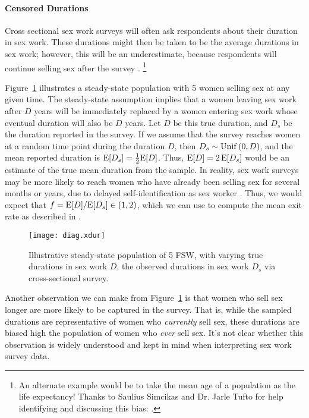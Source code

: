 \paragraph{Censored Durations}
Cross sectional sex work surveys will often ask respondents about their duration in sex work.
These durations might then be taken to be the average durations in sex work;
however, this will be an underestimate,
because respondents will continue selling sex after the survey \cite{Fazito2012}.%
\footnote{An alternate example would be
  to take the mean age of a population as the life expectancy!
  Thanks to Saulius Simcikas and Dr. Jarle Tufto
  for help identifying and discussing this bias:
  .}
\par
Figure~\ref{fig:diag.xdur} illustrates a steady-state population
with 5 women selling sex at any given time.
The steady-state assumption implies that a women leaving sex work after $D$ years
will be immediately replaced by a women entering sex work
whose eventual duration will also be $D$ years.
Let $D$ be this true duration, and $D_s$ be the duration reported in the survey.
If we assume that the survey reaches women at a random time point during the duration $D$,
then $D_s \sim \operatorname{Unif}\,(0,D)$,
and the mean reported duration is $\textnormal{E}[D_s] = \frac{1}{2}\textnormal{E}[D]$.
Thus, $\textnormal{E}[D] = 2\,\textnormal{E}[D_s]$ would be an estimate of the true mean duration from the sample.
In reality, sex work surveys may be more likely to reach
women who have already been selling sex for several months or years,
due to delayed self-identification as sex worker \cite{Cheuk2020}.
Thus, we would expect that $f = \textnormal{E}[D] / \textnormal{E}[D_s] \in (1,2)$,
which we can use to compute the mean exit rate as described in .
\begin{figure}[h]
  \centering
  \texttt{[image: diag.xdur]}
  \caption{Illustrative steady-state population of 5 FSW,
    with varying true durations in sex work $D$,
    \vs the observed durations in sex work $D_s$ via cross-sectional survey.}
  \label{fig:diag.xdur}
\end{figure}
\par
Another observation we can make from Figure~\ref{fig:diag.xdur} is that
women who sell sex longer are more likely to be captured in the survey.
That is, while the sampled durations are representative of women who \emph{currently} sell sex,
these durations are biased high \vs the population of women who \emph{ever} sell sex.
It's not clear whether this observation is widely understood
and kept in mind when interpreting sex work survey data.
